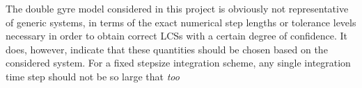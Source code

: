 %
%
The double gyre model considered in this project is obviously not representative
of generic systems, in terms of the exact numerical step lengths or tolerance
levels necessary in order to obtain correct LCSs with a certain
degree of confidence. It does, however, indicate that these quantities should
be chosen based on the considered system. For a fixed stepsize integration
scheme, any single integration time step should not be so large that \emph{too}
